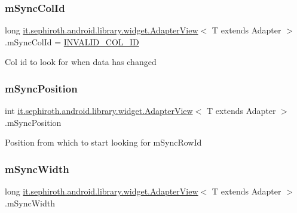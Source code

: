 \subsubsection{\texorpdfstring{m\+Sync\+Col\+Id}{mSyncColId}}
{\footnotesize\ttfamily long \hyperlink{classit_1_1sephiroth_1_1android_1_1library_1_1widget_1_1_adapter_view}{it.\+sephiroth.\+android.\+library.\+widget.\+Adapter\+View}$<$ T extends Adapter $>$.m\+Sync\+Col\+Id = \hyperlink{classit_1_1sephiroth_1_1android_1_1library_1_1widget_1_1_adapter_view_a4652ef84c3de9de7d3697a29e2bb96c6}{I\+N\+V\+A\+L\+I\+D\+\_\+\+C\+O\+L\+\_\+\+ID}\hspace{0.3cm}{\ttfamily [protected]}}

Col id to look for when data has changed \mbox{\label{classit_1_1sephiroth_1_1android_1_1library_1_1widget_1_1_adapter_view_a3e6e08a38ce37453e939ee6c45f34a1e}} 
\subsubsection{\texorpdfstring{m\+Sync\+Position}{mSyncPosition}}
{\footnotesize\ttfamily int \hyperlink{classit_1_1sephiroth_1_1android_1_1library_1_1widget_1_1_adapter_view}{it.\+sephiroth.\+android.\+library.\+widget.\+Adapter\+View}$<$ T extends Adapter $>$.m\+Sync\+Position\hspace{0.3cm}{\ttfamily [protected]}}

Position from which to start looking for m\+Sync\+Row\+Id \mbox{\label{classit_1_1sephiroth_1_1android_1_1library_1_1widget_1_1_adapter_view_aee0a13efcf49cd9c6deed47527345eff}} 
\subsubsection{\texorpdfstring{m\+Sync\+Width}{mSyncWidth}}
{\footnotesize\ttfamily long \hyperlink{classit_1_1sephiroth_1_1android_1_1library_1_1widget_1_1_adapter_view}{it.\+sephiroth.\+android.\+library.\+widget.\+Adapter\+View}$<$ T extends Adapter $>$.m\+Sync\+Width\hspace{0.3cm}{\ttfamily [protected]}}

